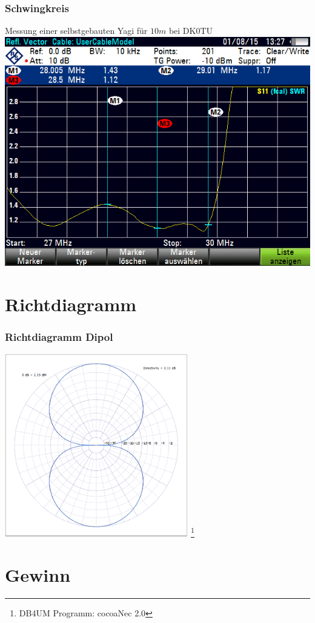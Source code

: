 \begin{frame}
    \frametitle{Schwingkreis}
    \begin{center} \large
    Messung einer selbstgebauten Yagi für $10m$ bei DK0TU
        \includegraphics[width=.7\textwidth]{e11/Measurement0010.png}
	\end{center}
\end{frame}


\section*{Richtdiagramm}

\begin{frame}
    \frametitle{Richtdiagramm Dipol}
    \begin{center}
        \includegraphics[width=0.6\textwidth]{e11/Richt-Dipol.png}
        \footnote{\tiny DB4UM Programm: cocoaNec 2.0}
	\end{center}
\end{frame}

\section*{Gewinn}


